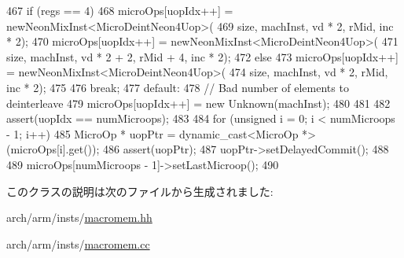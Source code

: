\begin{DoxyCode}
{{{467             if (regs == 4) {
468                 microOps[uopIdx++] = newNeonMixInst<MicroDeintNeon4Uop>(
469                         size, machInst, vd * 2, rMid, inc * 2);
470                 microOps[uopIdx++] = newNeonMixInst<MicroDeintNeon4Uop>(
471                         size, machInst, vd * 2 + 2, rMid + 4, inc * 2);
472             } else {
473                 microOps[uopIdx++] = newNeonMixInst<MicroDeintNeon4Uop>(
474                         size, machInst, vd * 2, rMid, inc * 2);
475             }
476             break;
477           default:
478             // Bad number of elements to deinterleave
479             microOps[uopIdx++] = new Unknown(machInst);
480         }
481     }
482     assert(uopIdx == numMicroops);
483 
484     for (unsigned i = 0; i < numMicroops - 1; i++) {
485         MicroOp * uopPtr = dynamic_cast<MicroOp *>(microOps[i].get());
486         assert(uopPtr);
487         uopPtr->setDelayedCommit();
488     }
489     microOps[numMicroops - 1]->setLastMicroop();
490 }

\end{DoxyCode}


このクラスの説明は次のファイルから生成されました:\begin{DoxyCompactItemize}
\item 
arch/arm/insts/\hyperlink{macromem_8hh}{macromem.hh}\item 
arch/arm/insts/\hyperlink{macromem_8cc}{macromem.cc}\end{DoxyCompactItemize}
